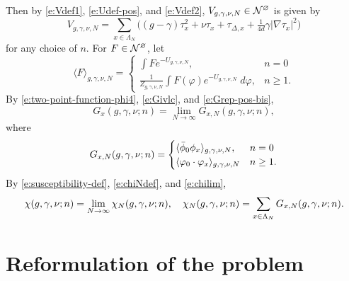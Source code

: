 Then by \eqref{e:Vdef1}, \eqref{e:Udef-pos}, and \eqref{e:Vdef2},
$V_{g,\gamma,\nu,N} \in \mathcal{N}^\varnothing$ is given by
\begin{equation}
V_{g,\gamma,\nu,N}
	=
\sum_{x\in\Lambda_N}
\Big(
	(g - \gamma) \tau_x^2 + \nu \tau_x + \tau_{\Delta,x} + \tfrac{1}{4 d} \gamma |\nabla\tau_x|^2
\Big)
\end{equation}
for any choice of $n$.
For $F \in \mathcal{N}^\varnothing$, let
\begin{equation}
\langle F \rangle_{g,\gamma,\nu,N}
	=
\begin{cases}
\displaystyle \int F e^{-U_{g,\gamma,\nu,N}},           & n = 0 \\
\displaystyle \frac{1}{Z_{g,\gamma,\nu,N}}
	\int F(\varphi) e^{-U_{g,\gamma,\nu,N}} \; d\varphi,  & n \ge 1.
\end{cases}
\end{equation}
By \eqref{e:two-point-function-phi4}, \eqref{e:Givlc}, and \eqref{e:Grep-pos-bis},
\begin{equation}
G_x(g, \gamma, \nu; n) = \lim_{N\to\infty} G_{x,N}(g, \gamma, \nu; n),
\end{equation}
where
\begin{equation}
G_{x,N}(g, \gamma, \nu; n)
	=
\begin{cases}
\langle \bar\phi_0 \phi_x \rangle_{g,\gamma,\nu,N},      & n = 0 \\
\langle \varphi_0 \cdot \varphi_x \rangle_{g,\gamma,\nu,N}  & n \ge 1.
\end{cases}
\end{equation}
By \eqref{e:susceptibility-def}, \eqref{e:chiNdef}, and \eqref{e:chilim},
\begin{equation}
\chi(g, \gamma, \nu; n)
	=
\lim_{N\rightarrow\infty} \chi_N(g, \gamma, \nu; n),
	\quad
\chi_N(g, \gamma, \nu; n)
	=
\sum_{x\in\Lambda_N} G_{x,N}(g, \gamma, \nu; n).
\end{equation}


\section{Reformulation of the problem}

